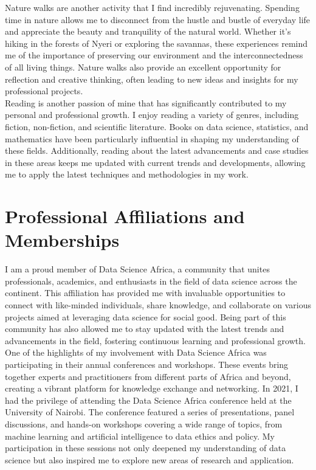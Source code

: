 \documentclass[12pt,a4paper,sans,english]{report}
\begin{document}
\noindent Nature walks are another activity that I find incredibly rejuvenating. Spending time in nature allows me to disconnect from the hustle and bustle of everyday life and appreciate the beauty and tranquility of the natural world. Whether it’s hiking in the forests of Nyeri or exploring the savannas, these experiences remind me of the importance of preserving our environment and the interconnectedness of all living things. Nature walks also provide an excellent opportunity for reflection and creative thinking, often leading to new ideas and insights for my professional projects.
\\
\noindent Reading is another passion of mine that has significantly contributed to my personal and professional growth. I enjoy reading a variety of genres, including fiction, non-fiction, and scientific literature. Books on data science, statistics, and mathematics have been particularly influential in shaping my understanding of these fields. Additionally, reading about the latest advancements and case studies in these areas keeps me updated with current trends and developments, allowing me to apply the latest techniques and methodologies in my work.

\chapter{Professional Affiliations and Memberships}

\noindent I am a proud member of Data Science Africa, a community that unites professionals, academics, and enthusiasts in the field of data science across the continent. This affiliation has provided me with invaluable opportunities to connect with like-minded individuals, share knowledge, and collaborate on various projects aimed at leveraging data science for social good. Being part of this community has also allowed me to stay updated with the latest trends and advancements in the field, fostering continuous learning and professional growth.\\

\noindent One of the highlights of my involvement with Data Science Africa was participating in their annual conferences and workshops. These events bring together experts and practitioners from different parts of Africa and beyond, creating a vibrant platform for knowledge exchange and networking. In 2021, I had the privilege of attending the Data Science Africa conference held at the University of Nairobi. The conference featured a series of presentations, panel discussions, and hands-on workshops covering a wide range of topics, from machine learning and artificial intelligence to data ethics and policy. My participation in these sessions not only deepened my understanding of data science but also inspired me to explore new areas of research and application.\\
\end{document}
